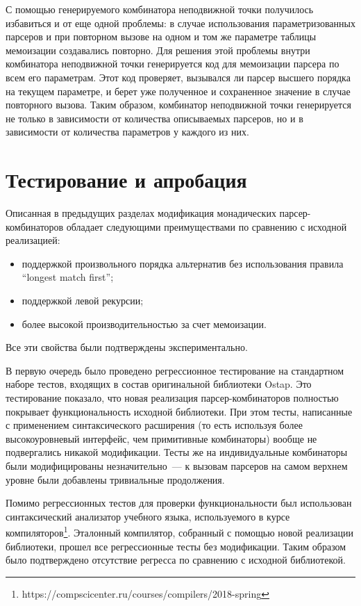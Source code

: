 \documentclass[conference]{IEEEtran}
\begin{document}
С помощью генерируемого комбинатора неподвижной точки получилось избавиться и от еще одной проблемы: в случае использования параметризованных парсеров и при повторном вызове на
одном и том же параметре таблицы мемоизации создавались повторно. Для решения этой проблемы внутри комбинатора неподвижной точки генерируется код для мемоизации парсера по всем
его параметрам. Этот код проверяет, вызывался ли парсер высшего порядка на текущем параметре, и берет уже полученное и сохраненное значение в случае повторного вызова.
Таким образом, комбинатор неподвижной точки генерируется не только в зависимости от количества описываемых парсеров, но и в зависимости от количества параметров у каждого из них.

\section{Тестирование и апробация}

Описанная в предыдущих разделах модификация монадических парсер-комбинаторов обладает следующими преимуществами по сравнению с исходной реализацией:

\begin{itemize}
  \item поддержкой произвольного порядка альтернатив без использования правила ``longest match first'';
  \item поддержкой левой рекурсии;
  \item более высокой производительностью за счет мемоизации.
\end{itemize}

Все эти свойства были подтверждены экспериментально.

В первую очередь было проведено регрессионное тестирование на стандартном наборе тестов, входящих в состав оригинальной библиотеки Ostap. Это тестирование показало,
что новая реализация парсер-комбинаторов полностью покрывает функциональность исходной библиотеки. При этом тесты, написанные с применением синтаксического расширения (то есть
используя более высокоуровневый интерфейс, чем примитивные комбинаторы) вообще не подвергались никакой модификации. Тесты же на индивидуальные комбинаторы были модифицированы
незначительно~--- к вызовам парсеров на самом верхнем уровне были добавлены тривиальные продолжения.

Помимо регрессионных тестов для проверки функциональности был использован синтаксический анализатор учебного языка, используемого в курсе
компиляторов\footnote{https://compscicenter.ru/courses/compilers/2018-spring}. Эталонный компилятор, собранный с помощью новой реализации библиотеки, прошел все
регрессионные тесты без модификации. Таким образом было подтверждено отсутствие регресса по сравнению с исходной библиотекой.
\end{document}
